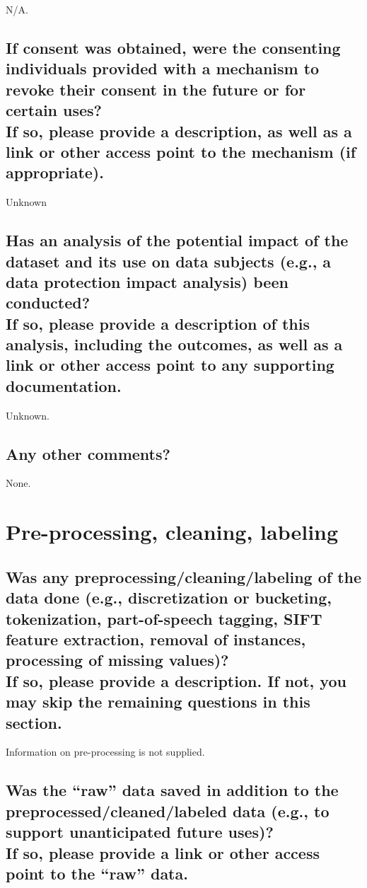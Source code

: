 \documentclass[letterpaper, 10 pt, conference]{ieeeconf}  %
\newcommand{\subtitle}[1]{{\\ \small \normalfont \color{purple} #1}}
\begin{document}
N/A.

\subsection{If consent was obtained, were the consenting individuals provided with a mechanism to revoke their consent in the future or for certain uses? \subtitle{If so, please provide a description, as well as a link or other access point to the mechanism (if appropriate).}}

Unknown

\subsection{Has an analysis of the potential impact of the dataset and its use on data subjects (e.g., a data protection impact analysis) been conducted? \subtitle{If so, please provide a description of this analysis, including the outcomes, as well as a link or other access point to any supporting documentation.}}

Unknown.

\subsection{Any other comments?}

None.

\section{Pre-processing, cleaning, labeling}

\subsection{Was any preprocessing/cleaning/labeling of the data done (e.g., discretization or bucketing, tokenization, part-of-speech tagging, SIFT feature extraction, removal of instances, processing of missing values)? \subtitle{If so, please provide a description. If not, you may skip the remaining questions in this section.}}

Information on pre-processing is not supplied.

\subsection{Was the “raw” data saved in addition to the preprocessed/cleaned/labeled data (e.g., to support unanticipated future uses)? \subtitle{If so, please provide a link or other access point to the “raw” data. }}
\end{document}
